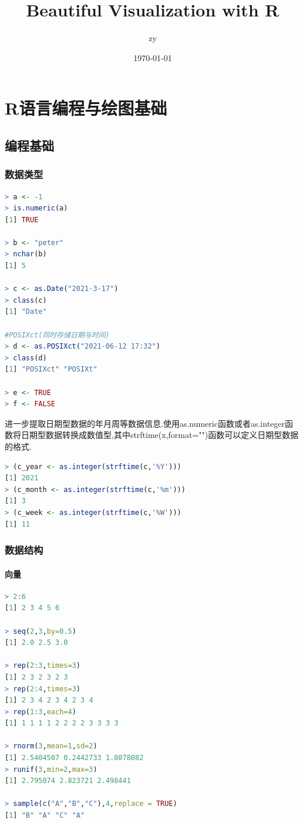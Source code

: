 \documentclass[11pt,a4paper,oneside]{book}
\title{\Huge Beautiful Visualization with R}
\author{zy}
\date{\today}
\begin{document}
\maketitle
\tableofcontents  %
\chapter{R语言编程与绘图基础}
\section{编程基础}
\subsection{数据类型}

\begin{lstlisting}[language=r]
> a <- -1
> is.numeric(a)
[1] TRUE

> b <- "peter"
> nchar(b)
[1] 5

> c <- as.Date("2021-3-17")
> class(c)
[1] "Date"

#POSIXct(同时存储日期与时间)
> d <- as.POSIXct("2021-06-12 17:32")
> class(d)
[1] "POSIXct" "POSIXt" 

> e <- TRUE
> f <- FALSE
\end{lstlisting}

进一步提取日期型数据的年月周等数据信息.使用as.numeric函数或者as.integer函数将日期型数据转换成数值型,其中strftime(x,format="")函数可以定义日期型数据的格式.
	

\begin{lstlisting}[language=r]
> (c_year <- as.integer(strftime(c,'%Y')))
[1] 2021
> (c_month <- as.integer(strftime(c,'%m')))
[1] 3
> (c_week <- as.integer(strftime(c,'%W')))
[1] 11
\end{lstlisting}


\subsection{数据结构}
\subsubsection{向量}
\begin{lstlisting}[language=r]
> 2:6
[1] 2 3 4 5 6

> seq(2,3,by=0.5)
[1] 2.0 2.5 3.0

> rep(2:3,times=3)
[1] 2 3 2 3 2 3
> rep(2:4,times=3)
[1] 2 3 4 2 3 4 2 3 4
> rep(1:3,each=4)
[1] 1 1 1 1 2 2 2 2 3 3 3 3

> rnorm(3,mean=1,sd=2)
[1] 2.5404507 0.2442733 1.8078082
> runif(3,min=2,max=3)
[1] 2.795074 2.823721 2.498441

> sample(c("A","B","C"),4,replace = TRUE)
[1] "B" "A" "C" "A"
\end{lstlisting}
\end{document}
